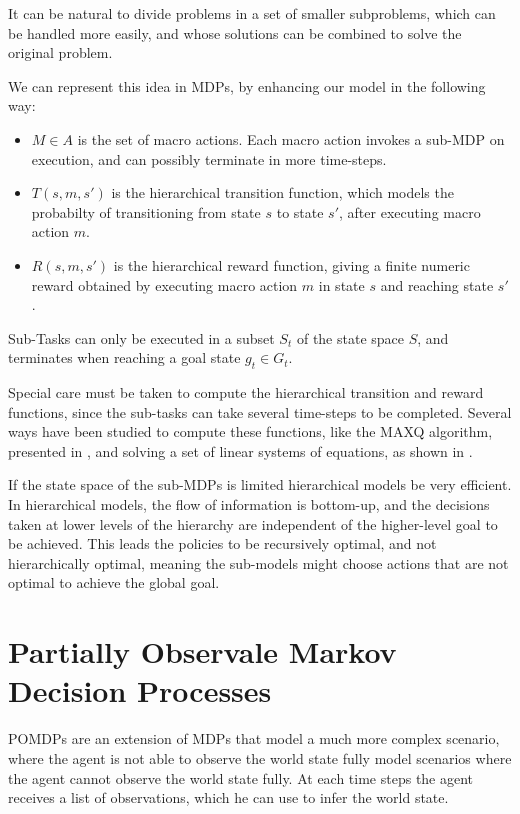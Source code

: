It can be natural to divide problems in a set of smaller subproblems, which can be handled more easily, and whose solutions can be combined to solve the original problem. 

We can represent this idea in MDPs, by enhancing our model in the following way:
\begin{itemize}
\item $M \in A$ is the set of macro actions. Each macro action invokes a sub-MDP on execution, and can possibly terminate in more time-steps.
\item  $T(s,m,s')$ is the hierarchical transition function, which models the probabilty of transitioning from state $s$ to state $s'$, after executing macro action $m$.
\item $R(s,m,s')$ is the hierarchical reward function, giving a finite numeric reward obtained by executing macro action $m$ in state $s$ and reaching state $s'$.
\end{itemize}

Sub-Tasks can only be executed in a subset $S_t$ of the state space $S$, and terminates when reaching a goal state $g_t \in G_t$.

Special care must be taken to compute the hierarchical transition and reward functions, since the sub-tasks can take several time-steps to be completed. Several ways have been studied to compute these functions, like the MAXQ algorithm, presented in \cite{dietterich2000hierarchical}, and solving a set of linear systems of equations, as shown in \cite{hauskrecht1998hierarchical}.

If the state space of the sub-MDPs is limited hierarchical models be very efficient. In hierarchical models, the flow of information is bottom-up, and the decisions taken at lower levels of the hierarchy are independent of the higher-level goal to be achieved. This leads the policies to be recursively optimal, and not hierarchically optimal, meaning the sub-models might choose actions that are not optimal to achieve the global goal.

\section{Partially Observale Markov Decision Processes}

POMDPs are an extension of MDPs that model a much more complex scenario, where the agent is not able to observe the world state fully model scenarios where the agent cannot observe the world state fully. At each time steps the agent receives a list of observations, which he can use to infer the world state.

